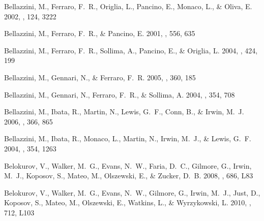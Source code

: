 \documentclass[manuscript]{aastex}
\begin{document}
\begin{thebibliography}{381}
{Bellazzini}, M., {Ferraro}, F.~R., {Origlia}, L., {Pancino}, E., {Monaco}, L.,
  \& {Oliva}, E. 2002, \aj, 124, 3222

{Bellazzini}, M., {Ferraro}, F.~R., \& {Pancino}, E. 2001, \apj, 556, 635

{Bellazzini}, M., {Ferraro}, F.~R., {Sollima}, A., {Pancino}, E., \& {Origlia},
  L. 2004{}, \aap, 424, 199

{Bellazzini}, M., {Gennari}, N., \& {Ferraro}, F.~R. 2005, \mnras, 360, 185

{Bellazzini}, M., {Gennari}, N., {Ferraro}, F.~R., \& {Sollima}, A.
  2004{}, \mnras, 354, 708

{Bellazzini}, M., {Ibata}, R., {Martin}, N., {Lewis}, G.~F., {Conn}, B., \&
  {Irwin}, M.~J. 2006, \mnras, 366, 865

{Bellazzini}, M., {Ibata}, R., {Monaco}, L., {Martin}, N., {Irwin}, M.~J., \&
  {Lewis}, G.~F. 2004{}, \mnras, 354, 1263

{Belokurov}, V., {Walker}, M.~G., {Evans}, N.~W., {Faria}, D.~C., {Gilmore},
  G., {Irwin}, M.~J., {Koposov}, S., {Mateo}, M., {Olszewski}, E., \& {Zucker},
  D.~B. 2008, \apjl, 686, L83

{Belokurov}, V., {Walker}, M.~G., {Evans}, N.~W., {Gilmore}, G., {Irwin},
  M.~J., {Just}, D., {Koposov}, S., {Mateo}, M., {Olszewski}, E., {Watkins},
  L., \& {Wyrzykowski}, L. 2010, \apjl, 712, L103


\end{thebibliography}
\end{document}
